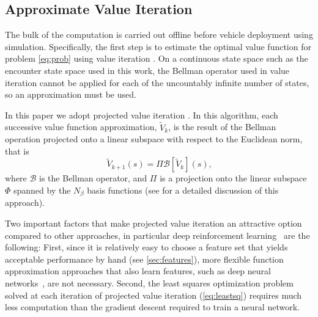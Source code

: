 \subsection{Approximate Value Iteration} \label{sec:iter}

The bulk of the computation is carried out offline before vehicle deployment using simulation. Specifically, the first step is to estimate the optimal value function for problem \eqref{eq:prob} using value iteration \cite{DB:05}. On a continuous state space such as the encounter state space used in this work, the Bellman operator used in value iteration cannot be applied for each of the uncountably infinite number of states, so an approximation must be used.

In this paper we adopt projected value iteration \cite{DB:05}. 
In this algorithm, each successive value function approximation, $\tilde{V}_k$, is the result of the Bellman operation projected onto a linear subspace with respect to the Euclidean norm, that is
\begin{equation}\label{eqn:projvi}
    \tilde{V}_{k+1}(s) = \Pi \mathcal{B}[\tilde{V}_k](s) \text{,}
\end{equation}
where $\mathcal{B}$ is the Bellman operator, and $\Pi$ is a projection onto the linear subspace $\Phi$ spanned by the $N_\beta$ basis functions (see \cite{DB:05} for a detailed discussion of this approach).

Two important factors that make projected value iteration an attractive option compared to other approaches, in particular deep reinforcement learning~\cite{mnih2015human} are the following:
First, since it is relatively easy to choose a feature set that yields acceptable performance by hand (see \cref{sec:features}), more flexible function approximation approaches that also learn features, such as deep neural networks~\cite{goodfellow2016deep}, are not necessary.
Second, the least squares optimization problem solved at each iteration of projected value iteration (\ref{eq:leastsq}) requires much less computation than the gradient descent required to train a neural network.

